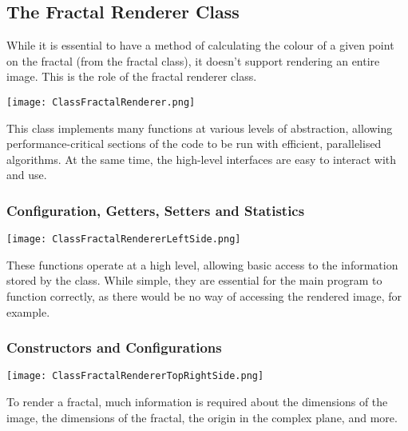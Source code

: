 \subsection{The Fractal Renderer Class}

While it is essential to have a method of calculating the colour of a given point on the fractal (from the fractal class), it doesn't support rendering an entire image. This is the role of the fractal renderer class.

\FloatBarrier
\begin{figure*}[htp]
    \centering
    \texttt{[image: ClassFractalRenderer.png]}
\end{figure*}
\FloatBarrier

This class implements many functions at various levels of abstraction, allowing performance-critical sections of the code to be run with efficient, parallelised algorithms. At the same time, the high-level interfaces are easy to interact with and use.

\subsubsection{Configuration, Getters, Setters and Statistics}

\FloatBarrier
\begin{figure*}[htp]
    \centering
    \texttt{[image: ClassFractalRendererLeftSide.png]}
\end{figure*}
\FloatBarrier

These functions operate at a high level, allowing basic access to the information stored by the class. While simple, they are essential for the main program to function correctly, as there would be no way of accessing the rendered image, for example.

\subsubsection{Constructors and Configurations}

\FloatBarrier
\begin{figure*}[htp]
    \centering
    \texttt{[image: ClassFractalRendererTopRightSide.png]}
\end{figure*}
\FloatBarrier

To render a fractal, much information is required about the dimensions of the image, the dimensions of the fractal, the origin in the complex plane, and more.

